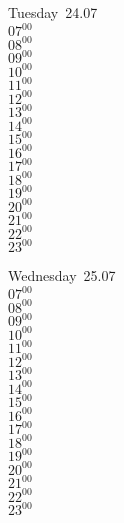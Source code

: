 \documentclass[11pt, a4paper]{book}\usepackage[]{graphicx}\usepackage[]{color}
\begin{document}
\begin{weekdaybox}
  Tuesday~24.07\\
  { 
  \vfill
  $07^{00}$\\
$08^{00}$\\
$09^{00}$\\
$10^{00}$\\
$11^{00}$\\
$12^{00}$\\
$13^{00}$\\
$14^{00}$\\
$15^{00}$\\
$16^{00}$\\
$17^{00}$\\
$18^{00}$\\
$19^{00}$\\
$20^{00}$\\
$21^{00}$\\
$22^{00}$\\
$23^{00}$\\
  }
\end{weekdaybox}
\begin{weekdaybox}
  Wednesday~25.07\\
  { 
  \vfill
  $07^{00}$\\
$08^{00}$\\
$09^{00}$\\
$10^{00}$\\
$11^{00}$\\
$12^{00}$\\
$13^{00}$\\
$14^{00}$\\
$15^{00}$\\
$16^{00}$\\
$17^{00}$\\
$18^{00}$\\
$19^{00}$\\
$20^{00}$\\
$21^{00}$\\
$22^{00}$\\
$23^{00}$\\
  }
\end{weekdaybox}
\clearpage
\begin{headerbox}
\end{headerbox}
\end{document}
